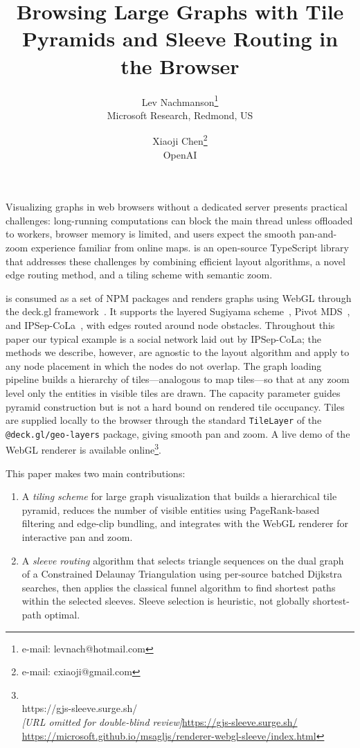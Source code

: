 \documentclass[review]{vgtc}          %
\title{Browsing Large Graphs with Tile Pyramids and Sleeve Routing in the Browser}
\author{Lev Nachmanson\thanks{e-mail: levnach@hotmail.com}\\ %
        \scriptsize Microsoft Research, Redmond, US %
\and Xiaoji Chen\thanks{e-mail: cxiaoji@gmail.com}\\ %
     \scriptsize OpenAI}
\newcommand{\msagljs}{\textsf{\libname}}
\newcommand{\anondemowebgl}{https://gjs-sleeve.surge.sh/}
\newcommand{\anondemourl}[2]{%
  \ifthenelse{\boolean{gdanonymous}}%
    {\ifx\\#1\\\textit{[URL omitted for double-blind review]}\else\url{#1}\fi}%
    {\url{#2}}%
}
\begin{document}

\maketitle
\label{sec:intro}

Visualizing graphs in web browsers without a dedicated server presents
practical challenges: long-running computations can block the main
thread unless offloaded to workers, browser memory is limited, and users expect
the smooth pan-and-zoom experience familiar from online
maps. \msagljs{}
is an open-source TypeScript library that addresses these challenges
by combining efficient layout algorithms, a novel edge routing method,
and a tiling scheme with semantic zoom.

\msagljs{} is consumed as a set of NPM packages and renders graphs
using WebGL through the deck.gl framework~\cite{deckgl}. It supports
the layered Sugiyama scheme~\cite{sugiyama1981}, Pivot
MDS~\cite{brandes2007eigensolver}, and
IPSep-CoLa~\cite{dwyer2006ipsepcola}, with edges routed around node
obstacles. Throughout this paper our typical example is a social
network laid out by IPSep-CoLa; the methods we describe, however, are
agnostic to the layout algorithm and apply to any node placement in
which the nodes do not overlap. The graph loading pipeline builds a
hierarchy of tiles---analogous to map tiles---so that at any zoom
level only the entities in visible tiles are drawn. The capacity
parameter guides pyramid construction but is not a hard bound on
rendered tile occupancy. Tiles are supplied locally
to the browser through the standard \texttt{TileLayer} of the
\texttt{@deck.gl/geo-layers} package, giving smooth pan and zoom. A live
demo of the WebGL renderer is available
online\footnote{\anondemourl{\anondemowebgl}{https://microsoft.github.io/msagljs/renderer-webgl-sleeve/index.html}}.

This paper makes two main contributions:
\begin{enumerate}
\item A \emph{tiling scheme} for large graph visualization that builds
  a hierarchical tile pyramid, reduces the number of visible entities using
  PageRank-based filtering and edge-clip bundling, and integrates with
  the WebGL renderer for interactive pan and zoom.
\item A \emph{sleeve routing} algorithm that selects triangle
  sequences on the dual graph of a Constrained Delaunay Triangulation
  using per-source batched Dijkstra searches, then applies the
  classical funnel algorithm to find shortest paths within the
  selected sleeves. Sleeve selection is heuristic, not globally
  shortest-path optimal.
\end{enumerate}
\end{document}
